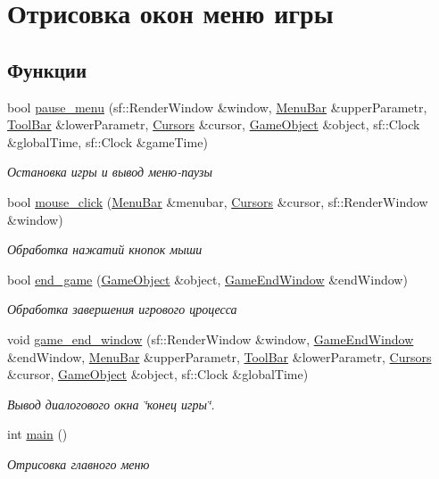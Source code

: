 \hypertarget{group__menu}{}\section{Отрисовка окон меню игры}
\label{group__menu}
\subsection*{Функции}
\begin{DoxyCompactItemize}
\item 
bool \hyperlink{group__menu_ga41b04beddc9426c2999858fabc479ac0}{pause\+\_\+menu} (sf\+::\+Render\+Window \&window, \hyperlink{classMenuBar}{Menu\+Bar} \&upper\+Parametr, \hyperlink{classToolBar}{Tool\+Bar} \&lower\+Parametr, \hyperlink{classCursors}{Cursors} \&cursor, \hyperlink{classGameObject}{Game\+Object} \&object, sf\+::\+Clock \&global\+Time, sf\+::\+Clock \&game\+Time)
\begin{DoxyCompactList}\small\item\em Остановка игры и вывод меню-\/паузы \end{DoxyCompactList}\item 
bool \hyperlink{group__menu_ga11dd1886453909da6eff52362bac59b8}{mouse\+\_\+click} (\hyperlink{classMenuBar}{Menu\+Bar} \&menubar, \hyperlink{classCursors}{Cursors} \&cursor, sf\+::\+Render\+Window \&window)
\begin{DoxyCompactList}\small\item\em Обработка нажатий кнопок мыши \end{DoxyCompactList}\item 
bool \hyperlink{group__menu_ga3259e0d309cf137b40488db0226f91f6}{end\+\_\+game} (\hyperlink{classGameObject}{Game\+Object} \&object, \hyperlink{classGameEndWindow}{Game\+End\+Window} \&end\+Window)
\begin{DoxyCompactList}\small\item\em Обработка завершения игрового цроцесса \end{DoxyCompactList}\item 
void \hyperlink{group__menu_gaac2382a6b5fa5b0687116caf16837b35}{game\+\_\+end\+\_\+window} (sf\+::\+Render\+Window \&window, \hyperlink{classGameEndWindow}{Game\+End\+Window} \&end\+Window, \hyperlink{classMenuBar}{Menu\+Bar} \&upper\+Parametr, \hyperlink{classToolBar}{Tool\+Bar} \&lower\+Parametr, \hyperlink{classCursors}{Cursors} \&cursor, \hyperlink{classGameObject}{Game\+Object} \&object, sf\+::\+Clock \&global\+Time)
\begin{DoxyCompactList}\small\item\em Вывод диалогового окна \char`\"{}конец игры\char`\"{}. \end{DoxyCompactList}\item 
int \hyperlink{group__menu_gae66f6b31b5ad750f1fe042a706a4e3d4}{main} ()
\begin{DoxyCompactList}\small\item\em Отрисовка главного меню \end{DoxyCompactList}\end{DoxyCompactItemize}


